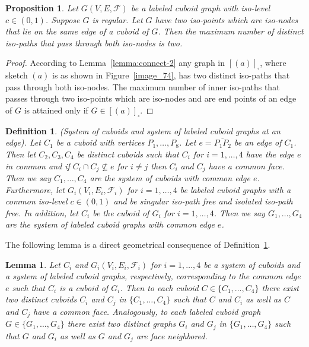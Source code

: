 \documentclass[a4paper,11pt]{article}
\newtheorem{lemma}[theorem]{Lemma}
\newtheorem{proposition}[theorem]{Proposition}
\newtheorem{definition}[theorem]{Definition}
\begin{document}
\begin{proposition}
Let $G(V,E,\mathcal{F})$ be a labeled cuboid graph with iso-level $c\in (0,1)$. Suppose $G$ is regular.
Let $G$ have two iso-points which are iso-nodes that lie on the same edge of a cuboid of $G$. Then the
maximum number of distinct iso-paths that pass through both iso-nodes is two.
\label{prop:connect-1}
\end{proposition}
\begin{proof}
According to Lemma~\ref{lemma:connect-2} any graph in $[(a)]_{\square}$, where sketch $(a)$ is as shown
in Figure~\ref{image_74}, has two distinct iso-paths that pass through both iso-nodes. The maximum
number of inner iso-paths that passes through two iso-points which are iso-nodes and are end points of
an edge of $G$ is attained only if $G\in[(a)]_{\square}$.
\end{proof}
\FloatBarrier

\begin{definition}(System of cuboids and system of labeled cuboid graphs at an edge). Let
$C_1$ be a cuboid with vertices $P_1,\ldots,P_8$. Let $e=\overline{P_1P_2}$ be an edge of $C_1$.
Then let $C_2,C_3,C_4$ be distinct cuboids such that  $C_i$ for $i=1,\ldots,4$ have the edge $e$
in common and if $C_i\cap C_j\nsubseteq e$ for $i\neq j$ then $C_i$ and $C_j$ have a common face.
Then we say $C_1,\ldots,C_4$ are the system of cuboids with common edge $e$. Furthermore, let
$G_i(V_i,E_i,\mathcal{F}_i)$ for $i=1,\ldots,4$ be labeled cuboid graphs with a common iso-level
$c\in (0,1)$ and be singular iso-path free and isolated iso-path free. In addition, let $C_i$ be
the cuboid of $G_i$ for $i=1,\ldots,4$. Then we say $G_1,\ldots,G_4$ are the system of labeled
cuboid graphs with common edge $e$.
\label{def:system-cuboid-1}
\end{definition}

The following lemma is a direct geometrical consequence of Definition~\ref{def:system-cuboid-1}.
\begin{lemma}
Let $C_i$ and $G_i(V_i,E_i,\mathcal{F}_i)$ for $i=1,\ldots,4$ be a system of cuboids and a system
of labeled cuboid graphs, respectively, corresponding to the common edge $e$ such that $C_i$ is a
cuboid of $G_i$. Then to each cuboid $C\in\{C_1,\ldots,C_4\}$ there exist two distinct cuboids
$C_i$ and $C_j$ in $\{C_1,\ldots,C_4\}$ such that $C$ and $C_i$ as well as $C$ and $C_j$ have a
common face. Analogously, to each labeled cuboid graph $G\in\{G_1,\ldots,G_4\}$ there exist two
distinct graphs $G_i$ and $G_j$ in $\{G_1,\ldots,G_4\}$ such that $G$ and $G_i$ as well as $G$
and $G_j$ are face neighbored.
\label{lem:system-cuboid-1}
\end{lemma}
\end{document}

